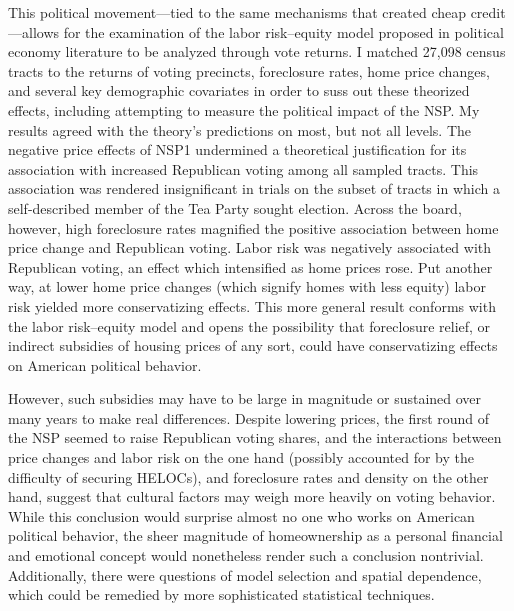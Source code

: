 \documentclass[12pt,oneside]{psthesis}
\begin{document}
This political movement---tied to the same mechanisms that created cheap credit---allows for the examination of the labor risk--equity model proposed in political economy literature to be analyzed through vote returns.
I matched 27,098 census tracts to the returns of voting precincts, foreclosure rates, home price changes, and several key demographic covariates in order to suss out these theorized effects, including attempting to measure the political impact of the NSP.
My results agreed with the theory's predictions on most, but not all levels.
The negative price effects of NSP1 undermined a theoretical justification for its association with increased Republican voting among all sampled tracts.
This association was rendered insignificant in trials on the subset of tracts in which a self-described member of the Tea Party sought election.
Across the board, however, high foreclosure rates magnified the positive association between home price change and Republican voting.
Labor risk was negatively associated with Republican voting, an effect which intensified as home prices rose.
Put another way, at lower home price changes (which signify homes with less equity) labor risk yielded more conservatizing effects.
This more general result conforms with the labor risk--equity model and opens the possibility that foreclosure relief, or indirect subsidies of housing prices of any sort, could have conservatizing effects on American political behavior.

However, such subsidies may have to be large in magnitude or sustained over many years to make real differences.
Despite lowering prices, the first round of the NSP seemed to raise Republican voting shares, and the interactions between price changes and labor risk on the one hand (possibly accounted for by the difficulty of securing HELOCs), and foreclosure rates and density on the other hand, suggest that cultural factors may weigh more heavily on voting behavior.
While this conclusion would surprise almost no one who works on American political behavior, the sheer magnitude of homeownership as a personal financial and emotional concept would nonetheless render such a conclusion nontrivial.
Additionally, there were questions of model selection and spatial dependence, which could be remedied by more sophisticated statistical techniques.
\end{document}
